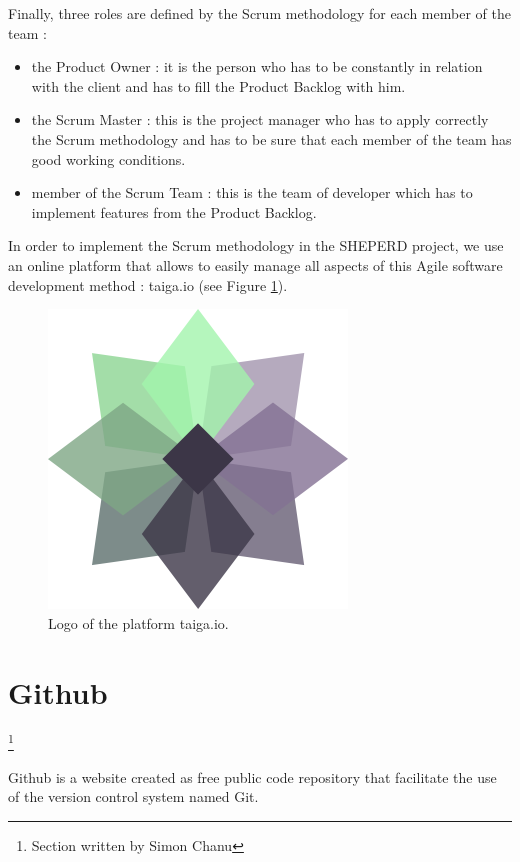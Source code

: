 \documentclass[a4paper]{report}
\begin{document}
Finally, three roles are defined by the Scrum methodology for each member of the team :

\begin{itemize}
	\item the Product Owner : it is the person who has to be constantly in relation with the client and has to fill the Product Backlog with him.
	\item the Scrum Master : this is the project manager who has to apply correctly the Scrum methodology and has to be sure that each member of the team has good working conditions.
	\item member of the Scrum Team : this is the team of developer which has to implement features from the Product Backlog.\\
\end{itemize}

In order to implement the Scrum methodology in the SHEPERD project, we use an online platform that allows to easily manage all aspects of this Agile software development method : taiga.io (see Figure \ref{fig:taiga_logo}).

\begin{figure}[H]
	\centering
	\includegraphics[width=0.6\linewidth]{image/taiga_io.png}
	\caption{Logo of the platform taiga.io.}
	\label{fig:taiga_logo}
\end{figure}

\section{Github}
\footnote{Section written by Simon Chanu}

Github is a website created as free public code repository that facilitate the use of the version control system named Git.
\end{document}
